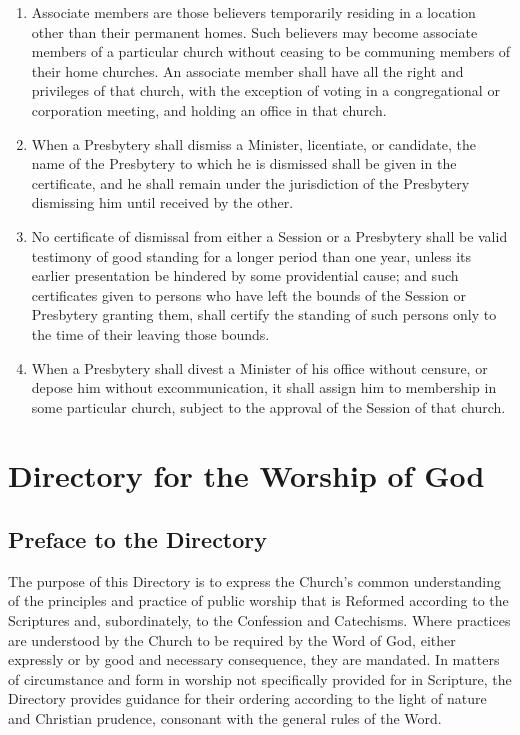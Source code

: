 \documentclass[
]{book}
\begin{document}
\begin{enumerate}
\item
  Associate members are those believers temporarily residing in a location other than their permanent homes. Such believers may become associate members of a particular church without ceasing to be communing members of their home churches. An associate member shall have all the right and privileges of that church, with the exception of voting in a congregational or corporation meeting, and holding an office in that church.
\item
  When a Presbytery shall dismiss a Minister, licentiate, or candidate, the name of the Presbytery to which he is dismissed shall be given in the certificate, and he shall remain under the jurisdiction of the Presbytery dismissing him until received by the other.
\item
  No certificate of dismissal from either a Session or a Presbytery shall be valid testimony of good standing for a longer period than one year, unless its earlier presentation be hindered by some providential cause; and such certificates given to persons who have left the bounds of the Session or Presbytery granting them, shall certify the standing of such persons only to the time of their leaving those bounds.
\item
  \protect\hypertarget{50.7}{\href{}{}}When a Presbytery shall divest a Minister of his office without censure, or depose him without excommunication, it shall assign him to membership in some particular church, subject to the approval of the Session of that church.
\end{enumerate}

\hypertarget{directory-for-the-worship-of-god}{%
\chapter*{Directory for the Worship of God}\label{directory-for-the-worship-of-god}}

\hypertarget{preface-to-the-directory}{%
\section*{Preface to the Directory}\label{preface-to-the-directory}}

\protect\hypertarget{dfw-preface}{\href{}{}}The purpose of this Directory is to express the Church's common understanding of the principles and practice of public worship that is Reformed according to the Scriptures and, subordinately, to the Confession and Catechisms. Where practices are understood by the Church to be required by the Word of God, either expressly or by good and necessary consequence, they are mandated. In matters of circumstance and form in worship not specifically provided for in Scripture, the Directory provides guidance for their ordering according to the light of nature and Christian prudence, consonant with the general rules of the Word.
\end{document}

